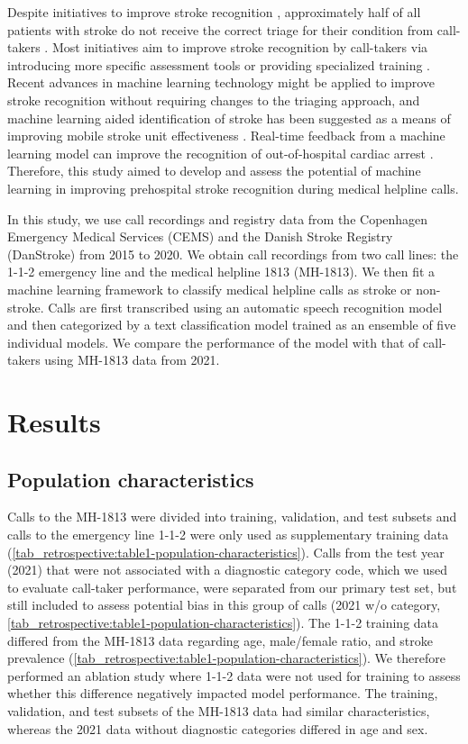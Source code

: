 {Despite initiatives to improve stroke recognition \parencite{cite8,cite9}, approximately half of all patients with stroke do not receive the correct triage for their condition from call-takers \parencite{cite10,cite11,cite12}. Most initiatives aim to improve stroke recognition by call-takers via introducing more specific assessment tools \parencite{cite8,cite9} or providing specialized training \parencite{cite13}. Recent advances in machine learning technology might be applied to improve stroke recognition without requiring changes to the triaging approach, and machine learning aided identification of stroke has been suggested as a means of improving mobile stroke unit effectiveness \parencite{cite7}. Real-time feedback from a machine learning model can improve the recognition of out-of-hospital cardiac arrest \parencite{cite14,cite15}. Therefore, this study aimed to develop and assess the potential of machine learning in improving prehospital stroke recognition during medical helpline calls. 

In this study, we use call recordings and registry data from the Copenhagen Emergency Medical Services (CEMS) and the Danish Stroke Registry (DanStroke) \parencite{cite16} from 2015 to 2020. We obtain call recordings from two call lines: the 1-1-2 emergency line and the medical helpline 1813 (MH-1813). We then fit a machine learning framework to classify medical helpline calls as stroke or non-stroke. Calls are first transcribed using an automatic speech recognition model and then categorized by a text classification model trained as an ensemble of five individual models. We compare the performance of the model with that of call-takers using MH-1813 data from 2021.


\section{Results}

\subsection{Population characteristics}
%
Calls to the MH-1813 were divided into training, validation, and test subsets and calls to the emergency line 1-1-2 were only used as supplementary training data (\cref{tab_retrospective:table1-population-characteristics}). Calls from the test year (2021) that were not associated with a diagnostic category code, which we used to evaluate call-taker performance, were separated from our primary test set, but still included to assess potential bias in this group of calls (2021 w/o category, \cref{tab_retrospective:table1-population-characteristics}). The 1-1-2 training data differed from the MH-1813 data regarding age, male/female ratio, and stroke prevalence (\cref{tab_retrospective:table1-population-characteristics}). We therefore performed an ablation study where 1-1-2 data were not used for training to assess whether this difference negatively impacted model performance. The training, validation, and test subsets of the MH-1813 data had similar characteristics, whereas the 2021 data without diagnostic categories differed in age and sex.

}
